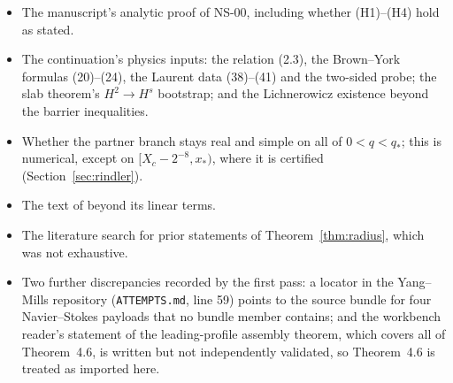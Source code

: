 \begin{itemize}
\item The manuscript's analytic proof of NS-00, including whether (H1)--(H4) hold as stated.
\item The continuation's physics inputs: the relation (2.3), the Brown--York formulas (20)--(24), the Laurent data (38)--(41) and the two-sided probe; the slab theorem's $H^2\to H^s$ bootstrap; and the Lichnerowicz existence beyond the barrier inequalities.
\item Whether the partner branch stays real and simple on all of $0<q<q_*$; this is numerical, except on $[X_c-2^{-8},x_*)$, where it is certified (Section~\ref{sec:rindler}).
\item The text of \cite[(6.3)]{CMST} beyond its linear terms.
\item The literature search for prior statements of Theorem~\ref{thm:radius}, which was not exhaustive.
\item Two further discrepancies recorded by the first pass: a locator in the Yang--Mills repository (\texttt{ATTEMPTS.md}, line 59) points to the source bundle for four Navier--Stokes payloads that no bundle member contains; and the workbench reader's statement of the leading-profile assembly theorem, which covers all of Theorem~4.6, is written but not independently validated, so Theorem~4.6 is treated as imported here.
\end{itemize}
